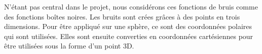   N'étant pas central dans le projet, nous considérons ces fonctions de bruis comme des fonctions boîtes noires.
  Les bruits sont crées grâces à des points en trois dimensions. Pour être appliqué sur une sphère, ce sont des coordonnées polaires qui sont utilisées. Elles sont ensuite converties en coordonnées cartésiennes pour être utilisées sous la forme d'un point 3D.\\

  
